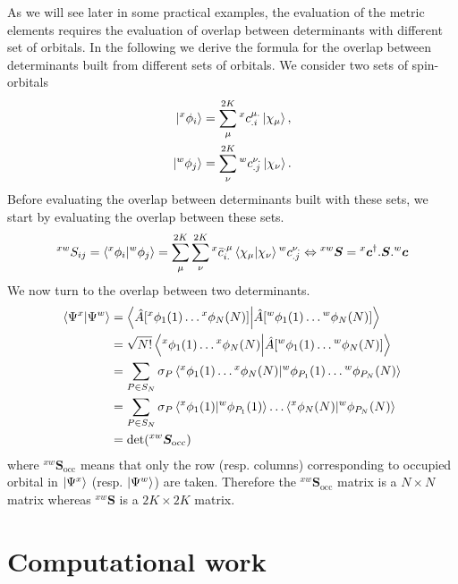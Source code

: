 \documentclass[11pt,a4paper]{article}
\newcommand{\hA}{\Hat{A}}
\begin{document}
As we will see later in some practical examples, the evaluation of the metric elements requires the evaluation of overlap between determinants with different set of orbitals.
In the following we derive the formula for the overlap between determinants built from different sets of orbitals.
We consider two sets of spin-orbitals
\begin{align}
  \ket{{}^{x}\phi_i} &= \sum^{2K}_\mu {}^{x}c_{.i}^{\mu .}\ket{\chi_\mu}, \\
  \ket{{}^{w}\phi_j} &= \sum^{2K}_\nu {}^{w}c_{.j}^{\nu .}\ket{\chi_\nu}.
\end{align}
Before evaluating the overlap between determinants built with these sets, we start by evaluating the overlap between these sets.
\begin{equation}
  \label{eq:NonOrtho_Overlap}
  ^{xw}S_{ij} = \braket{{}^{x}\phi_i}{{}^{w}\phi_j} = \sum^{2K}_\mu\sum^{2K}_\nu {}^{x}\bar{c}_{i.}^{.\mu}\braket{\chi_\mu}{\chi_\nu} {}^{w}c_{.j}^{\nu .} \Leftrightarrow {}^{xw}\bm{S} =  {}^{x}\bm{c}^\dagger.\bm{S}.{}^{w}\bm{c}
\end{equation}
We now turn to the overlap between two determinants.
\begin{subequations}
  \begin{align}
    \braket{\Psi^x}{\Psi^w} &= \braket{\hA\mleft[{}^x\phi_1(1)\dots{}^x\phi_N(N)\mright]}{\hA\mleft[{}^w\phi_1(1)\dots{}^w\phi_N(N)\mright]} \\
                            &= \sqrt{N!} \braket{{}^x\phi_1(1)\dots{}^x\phi_N(N)}{\hA\mleft[{}^w\phi_1(1)\dots{}^w\phi_N(N)\mright]} \\
                            &= \sum_{P\in S_N}\sigma_P \braket{{}^x\phi_1(1)\dots{}^x\phi_N(N)}{{}^w\phi_{P_1}(1)\dots{}^w\phi_{P_N}(N)} \\
                            &= \sum_{P\in S_N}\sigma_P   \braket{{}^x\phi_1(1)}{{}^w\phi_{P_1}(1)}\dots\braket{{}^x\phi_N(N)}{{}^w\phi_{P_N}(N)} \\
    &= \det({}^{xw}\bm{S}_{\text{occ}})
  \end{align}
\end{subequations}
where ${}^{xw}\bm{S}_{\text{occ}}$ means that only the row (resp. columns) corresponding to occupied orbital in $\ket{\Psi^x}$ (resp. $\ket{\Psi^w}$) are taken. Therefore the ${}^{xw}\bm{S}_{\text{occ}}$ matrix is a $N\times N$ matrix whereas ${}^{xw}\bm{S}$ is a $2K\times 2K$ matrix.

\section{Computational work}
\label{sec:compWork}
\end{document}

